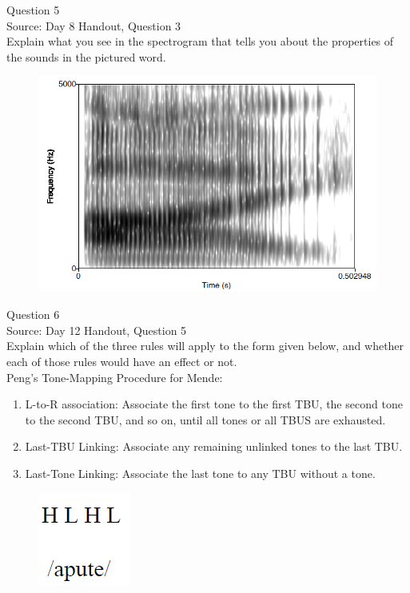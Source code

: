 \documentclass[12pt]{article}
\begin{document}
{\large Question 5}\\

Source: Day 8 Handout, Question 3\\

Explain what you see in the spectrogram that tells you about the properties of the sounds in the pictured word.\\

\begin{figure}[H]
\includegraphics{../images/spectrogram_I.png}
\end{figure}

\newpage

{\large Question 6}\\

Source: Day 12 Handout, Question 5\\

Explain which of the three rules will apply to the form given below, and whether each of those rules would have an effect or not.\\

Peng’s Tone-Mapping Procedure for Mende: \begin{enumerate} \item L-to-R association: Associate the first tone to the first TBU, the second tone to the second TBU, and so on, until all tones or all TBUS are exhausted. \item Last-TBU Linking: Associate any remaining unlinked tones to the last TBU. \item Last-Tone Linking: Associate the last tone to any TBU without a tone. \end{enumerate}

\begin{figure}[H]
\includegraphics{../images/mendetone_d.png}
\end{figure}
\end{document}
